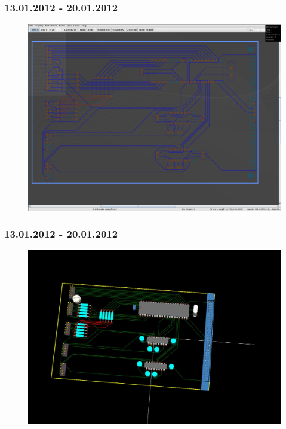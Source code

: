 \documentclass[ngerman]{beamer}
\begin{document}
\begin{frame}\frametitle{13.01.2012 - 20.01.2012}
\begin{figure}
\caption{\protect\includegraphics[scale=0.2]{./_Res/Circuit}}
\end{figure}
\end{frame}

\begin{frame}\frametitle{13.01.2012 - 20.01.2012}
\begin{figure}
\caption{\protect\includegraphics[scale=0.15]{./_Res/Translator}}
\end{figure}
\end{frame}
\end{document}
